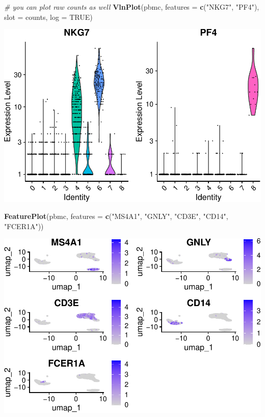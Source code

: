 \documentclass[
]{book}
\newenvironment{Shaded}{\begin{snugshade}}{\end{snugshade}}
\newcommand{\AttributeTok}[1]{\textcolor[rgb]{0.13,0.29,0.53}{#1}}
\newcommand{\CommentTok}[1]{\textcolor[rgb]{0.56,0.35,0.01}{\textit{#1}}}
\newcommand{\ConstantTok}[1]{\textcolor[rgb]{0.56,0.35,0.01}{#1}}
\newcommand{\FunctionTok}[1]{\textcolor[rgb]{0.13,0.29,0.53}{\textbf{#1}}}
\newcommand{\NormalTok}[1]{#1}
\newcommand{\StringTok}[1]{\textcolor[rgb]{0.31,0.60,0.02}{#1}}
\begin{document}
\begin{Shaded}
\begin{Highlighting}[]
\CommentTok{\# you can plot raw counts as well}
\FunctionTok{VlnPlot}\NormalTok{(pbmc, }\AttributeTok{features =} \FunctionTok{c}\NormalTok{(}\StringTok{"NKG7"}\NormalTok{, }\StringTok{"PF4"}\NormalTok{), }\AttributeTok{slot =} \StringTok{\textquotesingle{}counts\textquotesingle{}}\NormalTok{, }\AttributeTok{log =} \ConstantTok{TRUE}\NormalTok{)}
\end{Highlighting}
\end{Shaded}

\includegraphics{scRNAseqInR_Doco_files/figure-latex/unnamed-chunk-29-2.pdf}

\begin{Shaded}
\begin{Highlighting}[]
\FunctionTok{FeaturePlot}\NormalTok{(pbmc, }\AttributeTok{features =} \FunctionTok{c}\NormalTok{(}\StringTok{"MS4A1"}\NormalTok{, }\StringTok{"GNLY"}\NormalTok{, }\StringTok{"CD3E"}\NormalTok{, }\StringTok{"CD14"}\NormalTok{, }\StringTok{"FCER1A"}\NormalTok{))}
\end{Highlighting}
\end{Shaded}

\includegraphics{scRNAseqInR_Doco_files/figure-latex/markerplots-1.pdf}
\end{document}

